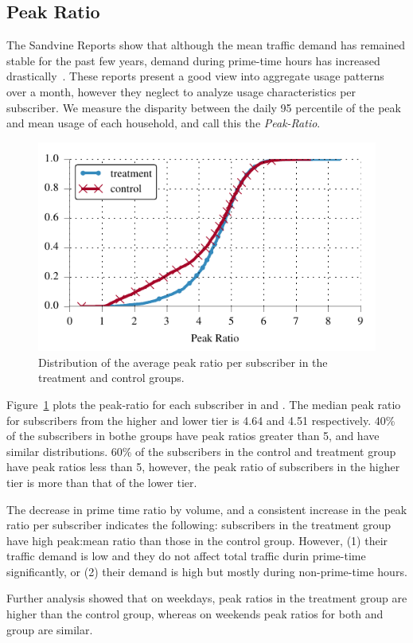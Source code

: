 \subsection{Peak Ratio}\label{subsec:peakratio}

The Sandvine Reports show that although the mean traffic demand has remained
stable for the past few years, demand during prime-time hours has increased
drastically~\cite{sandvine20141h}. These reports present a good view 
into aggregate usage patterns over a month, however they neglect to analyze usage
characteristics per subscriber.
We measure the disparity between the daily 95 percentile of the peak and 
mean usage of each household, and call this the \emph{Peak-Ratio}.

\begin{figure}[t]
\begin{minipage}{1\linewidth}
\centering
\includegraphics[width=1\linewidth]{figures/peakratio_cdf_mean-devices.pdf}
\caption{Distribution of the average peak ratio per subscriber in the treatment and 
control groups.}
\label{fig:CDF-peak-ratio-mean}
\end{minipage}
\end{figure}

Figure~\ref{fig:CDF-peak-ratio-mean} plots the peak-ratio for each 
subscriber in \treatment{} and \control{}. The median peak
ratio for subscribers from the higher and lower tier is 4.64 and 4.51
respectively. 40\% of the subscribers in bothe groups have peak ratios
greater than 5, and have similar distributions. 60\% of the subscribers
in the control and treatment group have peak ratios less than 5, however,
the peak ratio of subscribers in the higher tier is more than that of the lower
tier.

The decrease in prime time ratio by volume, and a consistent increase
in the peak ratio per subscriber indicates the following: subscribers in the treatment
group have high peak:mean ratio than those in the control group. However, (1) their
traffic demand is low and they do not affect total traffic durin prime-time significantly,
or (2) their demand is high but mostly during non-prime-time hours.

Further analysis showed that on weekdays, peak ratios in the treatment group are higher
than the control group, whereas on weekends peak ratios for both \control{} and \treatment{}
group are similar.